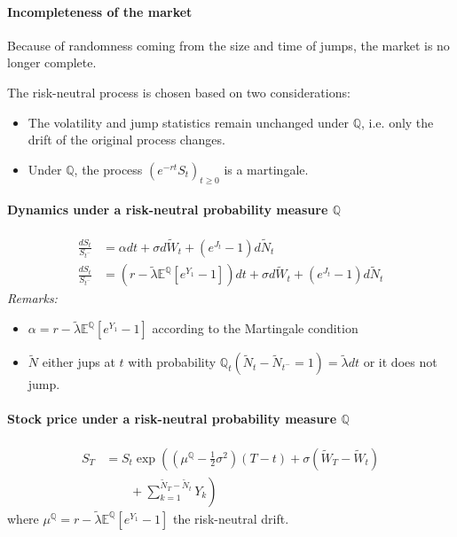 \documentclass[a4paper,landscape,7pt,fleqn]{scrartcl}
\begin{document}
\begin{multicols*}{3}
\paragraph{Incompleteness of the market}
Because of randomness coming from the size and time of jumps, the market is no longer complete.

The risk-neutral process is chosen based on two considerations:
\begin{itemize}
\item The volatility and jump statistics remain unchanged under $\mathbb{Q}$, i.e. only the drift of the original process changes.
\item Under $\mathbb{Q}$, the process $\left( e^{-rt} S_t \right)_{t \geq 0}$ is a martingale.
\end{itemize}

\paragraph{Dynamics under a risk-neutral probability measure $\mathbb{Q}$}
\begin{align*}
\frac{dS_t}{S_{t^-}} &= \alpha dt + \sigma d \tilde W_t + (e^{J_t} - 1) d \tilde N_t \\
\frac{dS_t}{S_{t^-}} &= \left( r - \tilde \lambda \mathbb{E}^\mathbb{Q} \left[ e^{Y_1} - 1 \right] \right) dt + \sigma d \tilde W_t + (e^{J_t} - 1) d \tilde N_t
\end{align*}
\textit{Remarks:}
\begin{itemize}
\item $\alpha = r - \tilde \lambda \mathbb{E}^\mathbb{Q} \left[ e^{Y_1} - 1 \right]$ according to the Martingale condition
\item $\tilde N$ either jups at $t$ with probability $\mathbb{Q}_t(\tilde N_t - \tilde N_{t^-} = 1) = \tilde \lambda dt$ or it does not jump.
\end{itemize}

\paragraph{Stock price under a risk-neutral probability measure $\mathbb{Q}$}
\begin{align*}
S_T &= S_t \exp \left( \left( \mu^\mathbb{Q} - \frac{1}{2} \sigma^2 \right) (T-t) + \sigma \left( \tilde W_T - \tilde W_t \right) \right. \\
& \qquad + \left. \sum_{k=1}^{\tilde N_T - \tilde N_t} Y_k \right)
\end{align*}
where $\mu^\mathbb{Q} = r - \tilde \lambda \mathbb{E}^\mathbb{Q} \left[ e^{Y_1} - 1 \right]$ the risk-neutral drift.


\end{multicols*}
\end{document}
